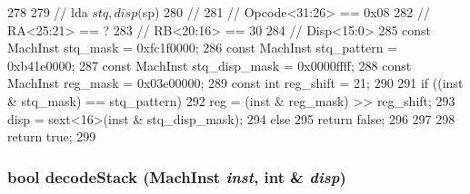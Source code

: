 \begin{DoxyCode}
278 {
279     // lda $stq, disp($sp)
280     //
281     // Opcode<31:26> == 0x08
282     // RA<25:21> == ?
283     // RB<20:16> == 30
284     // Disp<15:0>
285     const MachInst stq_mask = 0xfc1f0000;
286     const MachInst stq_pattern = 0xb41e0000;
287     const MachInst stq_disp_mask = 0x0000ffff;
288     const MachInst reg_mask = 0x03e00000;
289     const int reg_shift = 21;
290 
291     if ((inst & stq_mask) == stq_pattern) {
292         reg = (inst & reg_mask) >> reg_shift;
293         disp = sext<16>(inst & stq_disp_mask);
294     } else {
295         return false;
296     }
297 
298     return true;
299 }
\end{DoxyCode}
\hypertarget{classAlphaISA_1_1StackTrace_a61ba7618f77dc6e62d7b0baf6273130c}{
\subsubsection[{decodeStack}]{\setlength{\rightskip}{0pt plus 5cm}bool decodeStack ({\bf MachInst} {\em inst}, \/  int \& {\em disp})}}
\label{classAlphaISA_1_1StackTrace_a61ba7618f77dc6e62d7b0baf6273130c}



